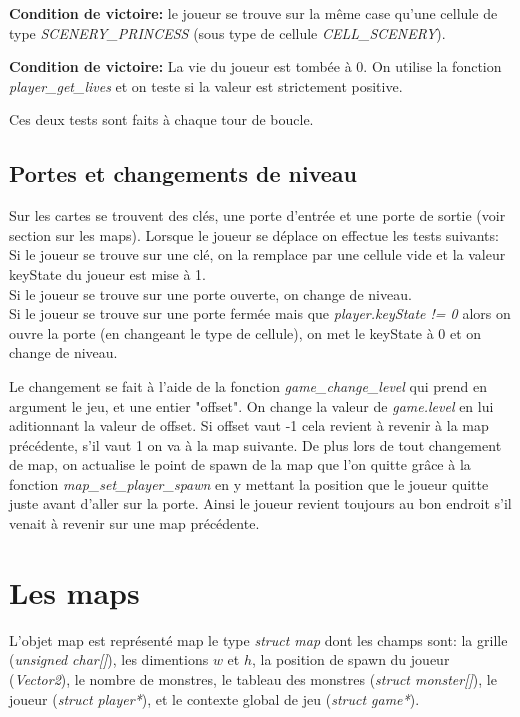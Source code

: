 \documentclass[12pt,a4paper]{article} %
\begin{document}
\textbf{Condition de victoire:} le joueur se trouve sur la même case qu'une cellule de type \emph{SCENERY\_PRINCESS} (sous type de cellule \emph{CELL\_SCENERY}).

\textbf{Condition de victoire:} La vie du joueur est tombée à 0. On utilise la fonction \emph{player\_get\_lives} et on teste si la valeur est strictement positive.

Ces deux tests sont faits à chaque tour de boucle.

\subsection{Portes et changements de niveau}

Sur les cartes se trouvent des clés, une porte d'entrée et une porte de sortie (voir section sur les maps). Lorsque le joueur se déplace on effectue les tests suivants:\\
Si le joueur se trouve sur une clé, on la remplace par une cellule vide et la valeur keyState du joueur est mise à 1.\\
Si le joueur se trouve sur une porte ouverte, on change de niveau.\\
Si le joueur se trouve sur une porte fermée mais que \emph{player.keyState != 0} alors on ouvre la porte (en changeant le type de cellule), on met le keyState à 0 et on change de niveau.

Le changement se fait à l'aide de la fonction \emph{game\_change\_level} qui prend en argument le jeu, et une entier "offset". On change la valeur de \emph{game.level} en lui aditionnant la valeur de offset. Si offset vaut -1 cela revient à revenir à la map précédente, s'il vaut 1 on va à la map suivante. De plus lors de tout changement de map,
on actualise le point de spawn de la map que l'on quitte grâce à la fonction \emph{map\_set\_player\_spawn} en y mettant la position que le joueur quitte juste avant d'aller sur la porte. Ainsi le joueur revient toujours au bon endroit s'il venait à revenir sur une map précédente.

\section{Les maps}

L'objet map est représenté map le type \emph{struct map} dont les champs sont: la grille (\emph{unsigned char[]}), les dimentions $w$ et $h$, la position de spawn du joueur (\emph{Vector2}), le nombre de monstres, le tableau des monstres (\emph{struct monster[]}), le joueur (\emph{struct player*}), et le contexte global de jeu (\emph{struct game*}).
\end{document}

